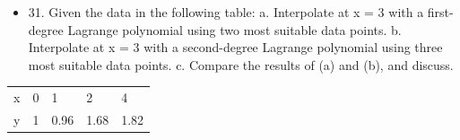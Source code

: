\documentclass{article}
\begin{document}
    \newpage
\begin{itemize}
    \item 31.  Given the data in the following table:
          \newline a. Interpolate at x = 3 with a first-degree Lagrange polynomial
          using two most suitable data points.
          \newline b. Interpolate at x = 3 with a second-degree Lagrange polynomial
          using three most suitable data points.
          \newline c. Compare the results of (a) and (b), and discuss.
\end{itemize}

\begin{table}[h!]
    \begin{tabular}{l|l|l|l|l}
        \hline
        \multicolumn{1}{|p{30.865313pt}}{\raggedright x} & \multicolumn{1}{|p{30.865313pt}}{\raggedright 0} & \multicolumn{1}{|p{30.865313pt}}{\raggedright 1}    & \multicolumn{1}{|p{30.1125pt}}{\raggedright 2}    & \multicolumn{1}{|p{30.1125pt}|}{\raggedright 4}    \\
        \cline{1-5}
        \multicolumn{1}{|p{30.865313pt}}{\raggedright y} & \multicolumn{1}{|p{30.865313pt}}{\raggedright 1} & \multicolumn{1}{|p{30.865313pt}}{\raggedright 0.96} & \multicolumn{1}{|p{30.1125pt}}{\raggedright 1.68} & \multicolumn{1}{|p{30.1125pt}|}{\raggedright 1.82} \\
        \hline
    \end{tabular}
\end{table}
\end{document}
